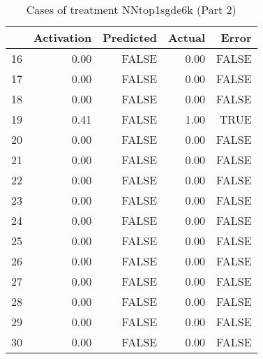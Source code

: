 \begin{table}[ht]
\centering
\begin{tabular}{rrrrr}
  \hline
 & Activation & Predicted & Actual & Error \\ 
  \hline
16 & 0.00 & FALSE & 0.00 & FALSE \\ 
  17 & 0.00 & FALSE & 0.00 & FALSE \\ 
  18 & 0.00 & FALSE & 0.00 & FALSE \\ 
  19 & 0.41 & FALSE & 1.00 & TRUE \\ 
  20 & 0.00 & FALSE & 0.00 & FALSE \\ 
  21 & 0.00 & FALSE & 0.00 & FALSE \\ 
  22 & 0.00 & FALSE & 0.00 & FALSE \\ 
  23 & 0.00 & FALSE & 0.00 & FALSE \\ 
  24 & 0.00 & FALSE & 0.00 & FALSE \\ 
  25 & 0.00 & FALSE & 0.00 & FALSE \\ 
  26 & 0.00 & FALSE & 0.00 & FALSE \\ 
  27 & 0.00 & FALSE & 0.00 & FALSE \\ 
  28 & 0.00 & FALSE & 0.00 & FALSE \\ 
  29 & 0.00 & FALSE & 0.00 & FALSE \\ 
  30 & 0.00 & FALSE & 0.00 & FALSE \\ 
   \hline
\end{tabular}
\caption{Cases of treatment NNtop1sgde6k (Part 2)} 
\end{table}
